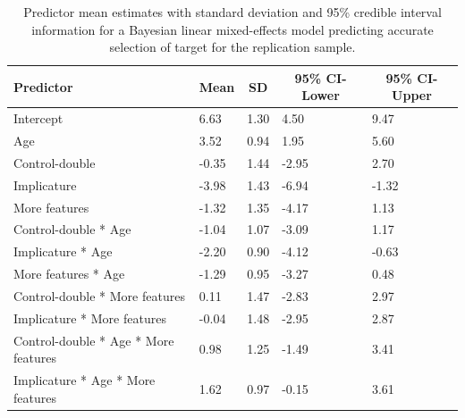 \documentclass[mask,man]{apa6}
\begin{document}
\begin{table}[tbp]
\begin{center}
\begin{threeparttable}
\caption{\label{tab:brmaccSample2}Predictor mean estimates with standard deviation and 95\% credible interval information for a Bayesian linear mixed-effects model predicting accurate selection of target for the replication sample.}
\begin{tabular}{lllll}
\toprule
Predictor & \multicolumn{1}{c}{Mean} & \multicolumn{1}{c}{SD} & \multicolumn{1}{c}{95\% CI-Lower} & \multicolumn{1}{c}{95\% CI-Upper}\\
\midrule
Intercept & 6.63 & 1.30 & 4.50 & 9.47\\
Age & 3.52 & 0.94 & 1.95 & 5.60\\
Control-double & -0.35 & 1.44 & -2.95 & 2.70\\
Implicature & -3.98 & 1.43 & -6.94 & -1.32\\
More features & -1.32 & 1.35 & -4.17 & 1.13\\
Control-double * Age & -1.04 & 1.07 & -3.09 & 1.17\\
Implicature * Age & -2.20 & 0.90 & -4.12 & -0.63\\
More features * Age & -1.29 & 0.95 & -3.27 & 0.48\\
Control-double * More features & 0.11 & 1.47 & -2.83 & 2.97\\
Implicature * More features & -0.04 & 1.48 & -2.95 & 2.87\\
Control-double * Age * More features & 0.98 & 1.25 & -1.49 & 3.41\\
Implicature * Age * More features & 1.62 & 0.97 & -0.15 & 3.61\\
\bottomrule
\end{tabular}
\end{threeparttable}
\end{center}
\end{table}
\end{document}
